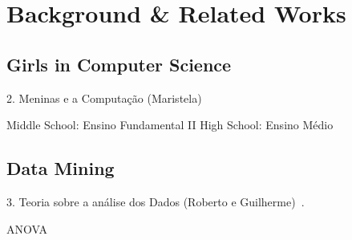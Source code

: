 \section{Background \& Related Works}\label{sec:background}%

\subsection{Girls in Computer Science}\label{subsec:girls}%
2. Meninas e a Computação (Maristela)

Middle School: Ensino Fundamental II
High School: Ensino Médio

\subsection{Data Mining}\label{subsec:mining}%
3. Teoria sobre a análise dos Dados (Roberto e Guilherme)~\cite{Cios2007}.

ANOVA ~\cite{Hastie2009}

